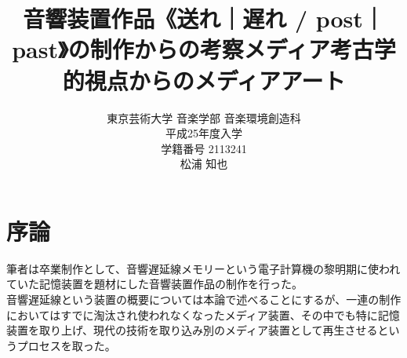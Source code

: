 \documentclass[a4paper,report]{jsbook}
\title{\Large 音響装置作品《送れ｜遅れ / post｜past》の制作からの考察\newline{\ddash}メディア考古学的視点からのメディアアート{\ddash}}
\author{東京芸術大学 音楽学部 音楽環境創造科\\平成25年度入学\\学籍番号 2113241\\松浦 知也}
\begin{document}
\maketitle

\tableofcontents

\makeatletter
\long{}
\makeatother

\makeatletter
\let\@oldmakecaption=\@makecaption
\let\oldthefigure=\thefigure
\let\oldtheHfigure=\theHfigure
\makeatother

\makeatletter
{}
\newenvironment{no-prefix-figure-caption}{
  \let\@makecaption=\@makenoprefixcaption
  \renewcommand\thefigure{x.\thefigno}
  \renewcommand\theHfigure{x.\thefigno}
  \stepcounter{figno}
}{
  \let\thefigure=\oldthefigure
  \let\theHfigure=\oldtheHfigure
  \let\@makecaption=\@oldmakecaption
  \addtocounter{figure}{-1}
}
\makeatother

\renewcommand{\figurename}{図}

\newcommand{\plusnamesingular}{}
\newcommand{\starnamesingular}{}
\newcommand{\xrefname}[1]{\protect\renewcommand{\plusnamesingular}{#1}}
\newcommand{\Xrefname}[1]{\protect\renewcommand{\starnamesingular}{#1}}
\providecommand{\cref}{\plusnamesingular~\ref}
\providecommand{\Cref}{\starnamesingular~\ref}
\providecommand{\crefformat}[2]{}
\providecommand{\Crefformat}[2]{}

\crefformat{figure}{図~#2#1#3}
\Crefformat{figure}{図~#2#1#3}

\chapter{序論}\label{ux5e8fux8ad6}

筆者は卒業制作として、音響遅延線メモリーという電子計算機の黎明期に使われていた記憶装置を題材にした音響装置作品の制作を行った。\\
音響遅延線という装置の概要については本論で述べることにするが、一連の制作においてはすでに淘汰され使われなくなったメディア装置、その中でも特に記憶装置を取り上げ、現代の技術を取り込み別のメディア装置として再生させるというプロセスを取った。
\end{document}
